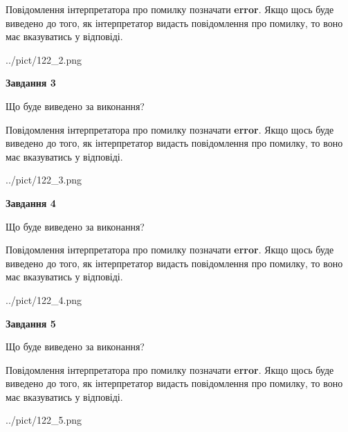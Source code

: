 \documentclass[12pt, ukrainian]{article}
\begin{document}
{\begin {large}
Повідомлення інтерпретатора про помилку позначати \textbf{error}.
Якщо щось буде виведено до того, як інтерпретатор видасть повідомлення про помилку, 
то воно має вказуватись у відповіді. \par


\begin{center}
	{../pict/122_2.png}
\end{center}
\newpage

{\begin {center}\textbf{Завдання 3}\end {center}}\par
Що буде виведено за виконання?

Повідомлення інтерпретатора про помилку позначати \textbf{error}.
Якщо щось буде виведено до того, як інтерпретатор видасть повідомлення про помилку, 
то воно має вказуватись у відповіді. \par


\begin{center}
	{../pict/122_3.png}
\end{center}
\newpage

{\begin {center}\textbf{Завдання 4}\end {center}}\par
Що буде виведено за виконання?

Повідомлення інтерпретатора про помилку позначати \textbf{error}.
Якщо щось буде виведено до того, як інтерпретатор видасть повідомлення про помилку, 
то воно має вказуватись у відповіді. \par


\begin{center}
	{../pict/122_4.png}
\end{center}
\newpage

{\begin {center}\textbf{Завдання 5}\end {center}}\par
Що буде виведено за виконання?

Повідомлення інтерпретатора про помилку позначати \textbf{error}.
Якщо щось буде виведено до того, як інтерпретатор видасть повідомлення про помилку, 
то воно має вказуватись у відповіді. \par


\begin{center}
	{../pict/122_5.png}
\end{center}
\newpage


\end{large}}
\end{document}
